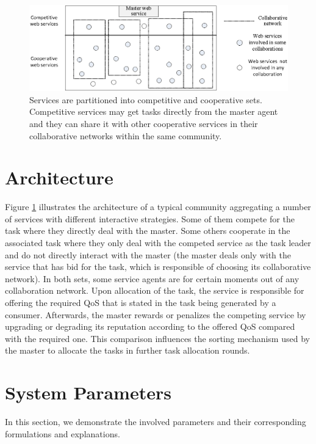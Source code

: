 \begin{figure}[h]
\centering
\includegraphics[scale=1]{Figures/architecture++.eps}
\caption{Services are partitioned into competitive and cooperative
sets. Competitive services may get tasks directly from the master
agent and they can share it with other cooperative services in
their collaborative networks within the same community.}
\label{architectureFigure}
\end{figure}

\section{Architecture}

Figure \ref{architectureFigure} illustrates the architecture of a
typical community aggregating a number of services with different
interactive strategies. Some of them compete for the task where
they directly deal with the master. Some others cooperate in the
associated task where they only deal with the competed service as
the task leader and do not directly interact with the master (the
master deals only with the service that has bid for the task,
which is responsible of choosing its collaborative network). In
both sets, some service agents are for certain moments out of any
collaboration network. Upon allocation of
the task, the service is responsible for offering the required QoS
that is stated in the task being generated by a consumer.
Afterwards,  the master rewards or penalizes the competing
service by upgrading or degrading its reputation according to the
offered QoS compared with the required one. This comparison
influences the sorting mechanism used by the master to allocate
the tasks in further task allocation rounds.




\section{System Parameters}
In this section, we demonstrate the involved parameters and their
corresponding formulations and explanations.

